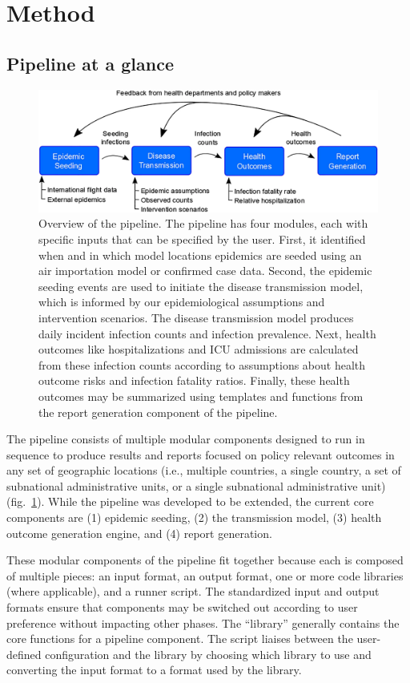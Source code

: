 \section{Method}
\subsection{Pipeline at a glance}
\begin{figure}[!htb]
    \centering
    \includegraphics[width = .8\textwidth]{fig_pipeline/fig1a}
    \caption[Overview of the pipeline.]{Overview of the pipeline. The pipeline has four modules, each with specific inputs that can be specified by the user. First, it identified when and in which model locations epidemics are seeded using an air importation model or confirmed case data. Second, the epidemic seeding events are used to initiate the disease transmission model, which is informed by our epidemiological assumptions and intervention scenarios. The disease transmission model produces daily incident infection counts and infection prevalence. Next, health outcomes like hospitalizations and ICU admissions are calculated from these infection counts according to assumptions about health outcome risks and infection fatality ratios. Finally, these health outcomes may be summarized using templates and functions from the report generation component of the pipeline.}
    \label{fig:pipeline-modules}
\end{figure}
The pipeline consists of multiple modular components designed to run in sequence to produce results and reports focused on policy relevant outcomes in any set of geographic locations (i.e., multiple countries, a single country, a set of subnational administrative units, or a single subnational administrative unit) (fig.~\ref{fig:pipeline-modules}). While the pipeline was developed to be extended, the current core components are (1) epidemic seeding, (2) the transmission model, (3) health outcome generation engine, and (4) report generation. 

These modular components of the pipeline fit together because each is composed of multiple pieces: an input format, an output format, one or more code libraries (where applicable), and a runner script. The standardized input and output formats ensure that components may be switched out according to user preference without impacting other phases. The “library” generally contains the core functions for a pipeline component. The script liaises between the user-defined configuration and the library by choosing which library to use and converting the input format to a format used by the library. 

